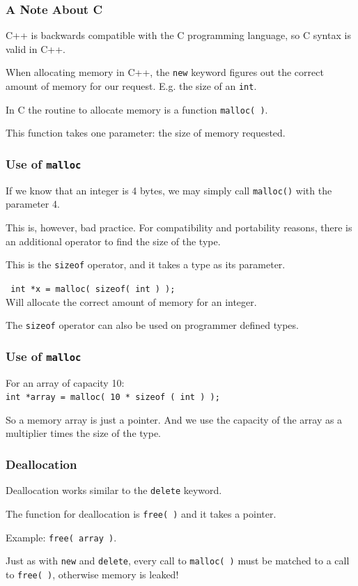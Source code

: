 \begin{frame}
\frametitle{A Note About C}

C++ is backwards compatible with the C programming language, so C syntax is valid in C++.

When allocating memory in C++, the \texttt{new} keyword figures out the correct amount of memory for our request. E.g. the size of an \texttt{int}.

In C the routine to allocate memory is a function \texttt{malloc( )}.

This function takes one parameter: the size of memory requested.

\end{frame}



\begin{frame}
\frametitle{Use of \texttt{malloc}}

If we know that an integer is 4 bytes, we may simply call \texttt{malloc()} with the parameter 4.

This is, however, bad practice. For compatibility and portability reasons, there is an additional operator to find the size of the type.

This is the \texttt{sizeof} operator, and it takes a type as its parameter.

\texttt{ int *x = malloc( sizeof( int ) );}\\
\quad Will allocate the correct amount of memory for an integer.

The \texttt{sizeof} operator can also be used on programmer defined types.

\end{frame}



\begin{frame}
\frametitle{Use of \texttt{malloc}}

For an array of capacity 10:\\
\quad \texttt{int *array = malloc( 10 * sizeof ( int ) );}

So a memory array is just a pointer. And we use the capacity of the array as a multiplier times the size of the type.

\end{frame}



\begin{frame}
\frametitle{Deallocation}

Deallocation works similar to the \texttt{delete} keyword.

The function for deallocation is \texttt{free( )} and it takes a pointer.

Example: \texttt{free( array )}.

Just as with \texttt{new} and \texttt{delete}, every call to \texttt{malloc( )} must be matched to a call to \texttt{free( )}, otherwise memory is leaked!


\end{frame}



